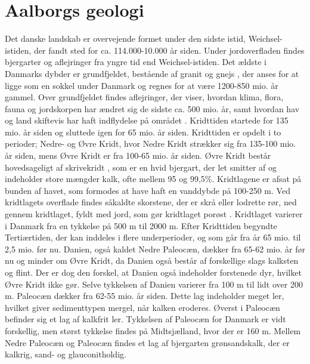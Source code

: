 \section{Aalborgs geologi}
Det danske landskab er overvejende formet under den sidste istid, Weichsel-istiden, der fandt sted for ca. 114.000-10.000 år siden. Under jordoverfladen findes bjergarter og aflejringer fra yngre tid end Weichsel-istiden. Det ældste i Danmarks dybder er grundfjeldet, bestående af granit og gnejs \citep{geopdf}, der anses for at ligge som en sokkel under Danmark og regnes for at være 1200-850 mio. år gammel. Over grundfjeldet findes aflejringer, der viser, hvordan klima, flora, fauna og jordskorpen har ændret sig de sidste ca. 500 mio. år, samt hvordan hav og land skiftevis har haft indflydelse på området \citep{geolink}.
\newline
\newline
Kridttiden startede for 135 mio. år siden og sluttede igen for 65 mio. år siden. Kridttiden er opdelt i to perioder; Nedre- og Øvre Kridt, hvor Nedre Kridt strækker sig fra 135-100 mio. år siden, mens Øvre Kridt er fra 100-65 mio. år siden.  Øvre Kridt består hovedsageligt af skrivekridt \citep{geopdf}, som er en hvid bjergart, der let smitter af og indeholder store mængder kalk, ofte mellem 95 og 99,5\%. Kridtlagene er afsat på bunden af havet, som formodes at have haft en vanddybde på 100-250 m. Ved kridtlagets overflade findes såkaldte skorstene, der er skrå eller lodrette rør, ned gennem kridtlaget, fyldt med jord, som gør kridtlaget porøst \citep[ s. 15-16]{geobog}. Kridtlaget varierer i Danmark fra en tykkelse på 500 m til 2000 m.
\newline
\newline
Efter Kridttiden begyndte Tertiærtiden, der kan inddeles i flere underperioder, og som går fra år 65 mio. til 2,5 mio. før nu. Danien, også kaldet Nedre Paleocæn, dækker fra 65-62 mio. år før nu og minder om Øvre Kridt, da Danien også består af forskellige slags kalksten og flint. Der er dog den forskel, at Danien også indeholder forstenede dyr, hvilket Øvre Kridt ikke gør. Selve tykkelsen af Danien varierer fra 100 m til lidt over 200 m. Paleocæn dækker fra 62-55 mio. år siden. Dette lag indeholder meget ler, hvilket giver sedimenttypen mergel, når kalken eroderes. Øverst i Paleocæn befinder sig et lag af kalkfrit ler. Tykkelsen af Paleocæn for Danmark er vidt forskellig, men størst tykkelse findes på Midtsjælland, hvor der er 160 m. Mellem Nedre Paleocæn og Paleocæn findes et lag af bjergarten grønsandskalk, der er kalkrig, sand- og glauconitholdig.
